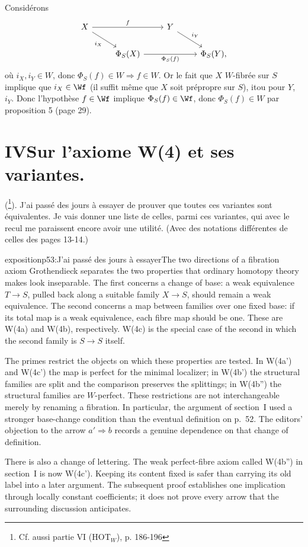 Considérons
\[ \begin{tikzcd}
X \arrow[rr, "f"] \arrow[dr, "i_X"'] & & Y \arrow[dr, "i_Y"] & \\
 & \Phi_S(X) \arrow[rr, "\Phi_S(f)"'] & & \Phi_S(Y),
\end{tikzcd} \]
où $i_X, i_Y \in W$, donc $\Phi_S(f) \in W \Rightarrow f \in W$. Or le fait que $X$ $W$-fibrée sur $S$ implique que $i_X \in \Wf$ (il suffit même que $X$ soit prépropre sur $S$), itou pour $Y$, $i_Y$. Donc l'hypothèse $f \in \Wf$ implique $\Phi_S(f) \in \Wf$, donc $\Phi_S(f) \in W$ par proposition 5 (page 29).



\section*{IV\quad Sur l'axiome W(4) et ses variantes.}

(\footnote[60]{Cf. aussi partie VI (HOT$_W$), p. 186-196}). J'ai passé des jours à essayer de prouver que toutes ces variantes sont équivalentes. Je vais donner une liste de celles, parmi ces variantes, qui avec le recul me paraissent encore avoir une utilité. (Avec des notations différentes de celles des pages 13-14.)

\begin{dcomment}{exposition}{p53:J'ai passé des jours à essayer}{The two directions of a fibration axiom}
Grothendieck separates the two properties that ordinary homotopy theory makes look inseparable. The first concerns a change of base: a weak equivalence $T\to S$, pulled back along a suitable family $X\to S$, should remain a weak equivalence. The second concerns a map between families over one fixed base: if its total map is a weak equivalence, each fibre map should be one. These are W(4a) and W(4b), respectively. W(4c) is the special case of the second in which the second family is $S\to S$ itself.

The primes restrict the objects on which these properties are tested. In W(4a') and W(4c') the map is perfect for the minimal localizer; in W(4b') the structural families are split and the comparison preserves the splittings; in W(4b'') the structural families are $W$-perfect. These restrictions are not interchangeable merely by renaming a fibration. In particular, the argument of section~I used a stronger base-change condition than the eventual definition on p.~52. The editors' objection to the arrow $a'\Rightarrow b$ records a genuine dependence on that change of definition.

There is also a change of lettering. The weak perfect-fibre axiom called W(4b'') in section~I is now W(4c'). Keeping its content fixed is safer than carrying its old label into a later argument. The subsequent proof establishes one implication through locally constant coefficients; it does not prove every arrow that the surrounding discussion anticipates.
\end{dcomment}


